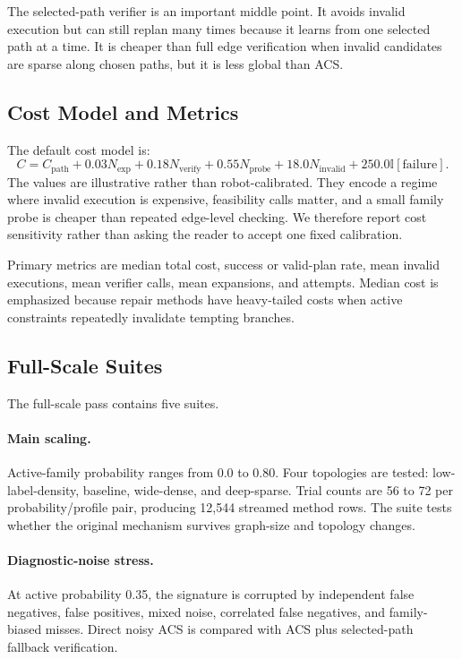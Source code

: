 \documentclass{article}
\newcommand{\ACS}{\textsc{ACS}}
\begin{document}
The selected-path verifier is an important middle point. It avoids invalid execution but can still replan many times because it learns from one selected path at a time. It is cheaper than full edge verification when invalid candidates are sparse along chosen paths, but it is less global than \ACS{}.

\subsection{Cost Model and Metrics}

The default cost model is:
\[
    C = C_{\mathrm{path}} + 0.03N_{\mathrm{exp}} + 0.18N_{\mathrm{verify}} + 0.55N_{\mathrm{probe}} + 18.0N_{\mathrm{invalid}} + 250.0\mathbb{I}[\mathrm{failure}].
\]
The values are illustrative rather than robot-calibrated. They encode a regime where invalid execution is expensive, feasibility calls matter, and a small family probe is cheaper than repeated edge-level checking. We therefore report cost sensitivity rather than asking the reader to accept one fixed calibration.

Primary metrics are median total cost, success or valid-plan rate, mean invalid executions, mean verifier calls, mean expansions, and attempts. Median cost is emphasized because repair methods have heavy-tailed costs when active constraints repeatedly invalidate tempting branches.

\subsection{Full-Scale Suites}

The full-scale pass contains five suites.

\paragraph{Main scaling.}
Active-family probability ranges from 0.0 to 0.80. Four topologies are tested: low-label-density, baseline, wide-dense, and deep-sparse. Trial counts are 56 to 72 per probability/profile pair, producing 12,544 streamed method rows. The suite tests whether the original mechanism survives graph-size and topology changes.

\paragraph{Diagnostic-noise stress.}
At active probability 0.35, the signature is corrupted by independent false negatives, false positives, mixed noise, correlated false negatives, and family-biased misses. Direct noisy \ACS{} is compared with \ACS{} plus selected-path fallback verification.
\end{document}
